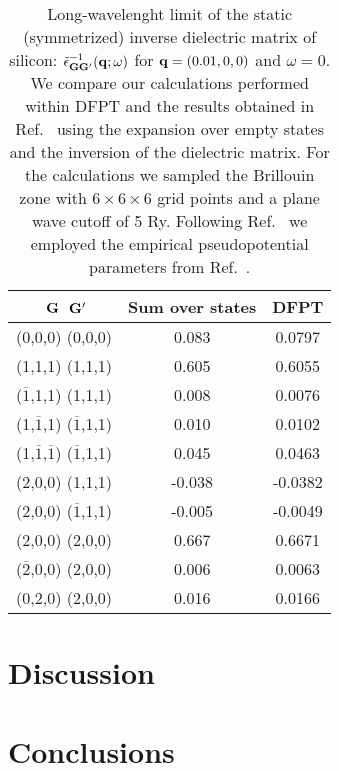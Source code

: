 \documentclass[twocolumn,prb,showpacs,superscriptaddress]{revtex4}
\def\w{\omega}
\def\q{{\bf q}}
\def\G{{\bf G}}
\def\Gp{{\bf G^\prime}}
\def\mo{$\overline{1}$}
\def\mt{$\overline{2}$}
\begin{document}
\begin{table}[b!]
\caption{\label{tab.1} Long-wavelenght limit of the static (symmetrized)
inverse dielectric matrix of silicon: $\tilde\epsilon^{-1}_{\G\Gp}(\q;\w)$ for
$\q=(0.01,0,0)$ and $\w=0$. We compare our calculations performed within
DFPT and the results obtained in Ref.\ 
using the expansion over empty states and the inversion of the dielectric matrix.
For the calculations we sampled the Brillouin zone with $6\times6\times6$ grid
points and a plane wave cutoff of 5 Ry. Following Ref.\ 
we employed the empirical pseudopotential parameters from Ref.\ .
\vspace{0.5cm}}
\begin{tabular}{c c c}
\hline
\hline
$\,\,\G$\phantom{ciao} $\,\Gp$   & Sum over states\cite{balde_tosa}  &  DFPT  \\
\hline
    (0,0,0) (0,0,0)   & \phantom{-}0.083    &  \phantom{-}0.0797  \\
 (1,1,1)  (1,1,1)     &   \phantom{-}0.605  & \phantom{-}0.6055 \\
(\mo,1,1) (1,1,1)     &   \phantom{-}0.008  & \phantom{-}0.0076 \\
 (1,\mo,1) (\mo,1,1)  & \phantom{-}0.010    & \phantom{-}0.0102 \\
 (1,\mo,\mo) (\mo,1,1)& \phantom{-}0.045    & \phantom{-}0.0463 \\
 (2,0,0) (1,1,1)      &    -0.038           & -0.0382 \\
 (2,0,0) (\mo,1,1)    &    -0.005           & -0.0049 \\
 (2,0,0) (2,0,0)      &  \phantom{-}0.667   & \phantom{-}0.6671 \\
 (\mt,0,0) (2,0,0)    & \phantom{-}0.006    & \phantom{-}0.0063 \\
 (0,2,0) (2,0,0)      &  \phantom{-}0.016   & \phantom{-}0.0166 \\
\hline
\hline
\end{tabular}
\end{table}

\section{Discussion}\label{sec.discussion}

\section{Conclusions}\label{sec.conclusions}
\end{document}
